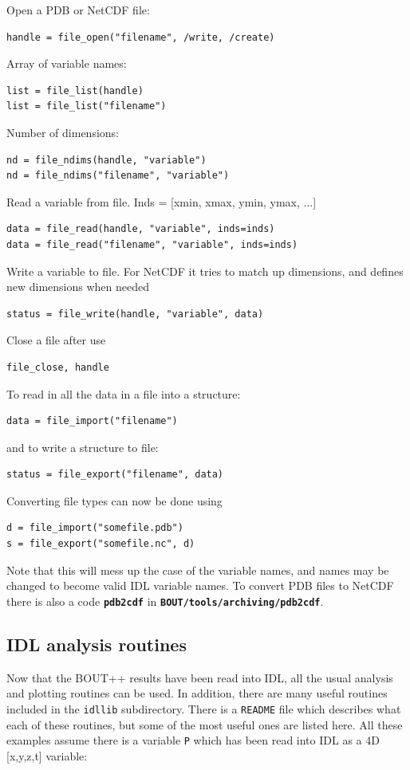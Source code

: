 \documentclass[12pt]{article}
\newcommand{\code}[1]{\texttt{#1}}
\newcommand{\file}[1]{\texttt{\bf #1}}
\begin{document}
Open a PDB or NetCDF file:
%
\begin{verbatim}
handle = file_open("filename", /write, /create)
\end{verbatim}
%
Array of variable names:
%
\begin{verbatim}
list = file_list(handle)
list = file_list("filename")
\end{verbatim}
%
Number of dimensions:
%
\begin{verbatim}
nd = file_ndims(handle, "variable")
nd = file_ndims("filename", "variable")
\end{verbatim}
%
Read a variable from file. Inds = [xmin, xmax, ymin, ymax, ...]
%
\begin{verbatim}
data = file_read(handle, "variable", inds=inds)
data = file_read("filename", "variable", inds=inds)
\end{verbatim}
%
Write a variable to file. For NetCDF it tries to match up dimensions, and
defines new dimensions when needed
%
\begin{verbatim}
status = file_write(handle, "variable", data)
\end{verbatim}
%
Close a file after use
%
\begin{verbatim}
file_close, handle
\end{verbatim}
%
To read in all the data in a file into a structure:
%
\begin{verbatim}
data = file_import("filename")
\end{verbatim}
%
and to write a structure to file:
%
\begin{verbatim}
status = file_export("filename", data)
\end{verbatim}
%
Converting file types can now be done using
%
\begin{verbatim}
d = file_import("somefile.pdb")
s = file_export("somefile.nc", d)
\end{verbatim}
%
Note that this will mess up the case of the variable names, and names may be
changed to become valid IDL variable names.  To convert PDB files to NetCDF
there is also a code \file{pdb2cdf} in \file{BOUT/tools/archiving/pdb2cdf}.



\subsection{IDL analysis routines}
%
Now that the BOUT++ results have been read into IDL, all the usual analysis and
plotting routines can be used. In addition, there are many useful routines
included in the \texttt{idllib} subdirectory. There is a \texttt{README} file
which describes what each of these routines, but some of the most useful ones
are listed here. All these examples assume there is a variable \code{P} which
has been read into IDL as a 4D [x,y,z,t] variable:
\end{document}
